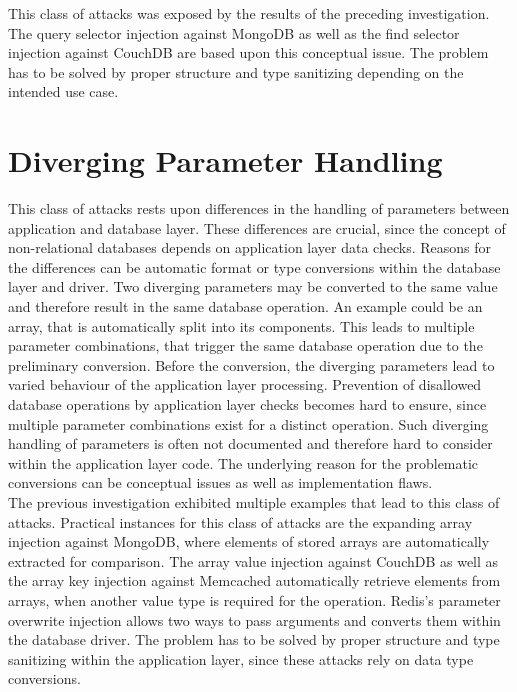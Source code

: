 This class of attacks was exposed by the results of the preceding investigation. The query selector injection against MongoDB as well as the find selector injection against CouchDB are based upon this conceptual issue. The problem has to be solved by proper structure and type sanitizing depending on the intended use case.

\section{Diverging Parameter Handling}
This class of attacks rests upon differences in the handling of parameters between application and database layer. These differences are crucial, since the concept of non-relational databases depends on application layer data checks. Reasons for the differences can be automatic format or type conversions within the database layer and driver. Two diverging parameters may be converted to the same value and therefore result in the same database operation. An example could be an array, that is automatically split into its components. This leads to multiple parameter combinations, that trigger the same database operation due to the preliminary conversion. Before the conversion, the diverging parameters lead to varied behaviour of the application layer processing. Prevention of disallowed database operations by application layer checks becomes hard to ensure, since multiple parameter combinations exist for a distinct operation. Such diverging handling of parameters is often not documented and therefore hard to consider within the application layer code. The underlying reason for the problematic conversions can be conceptual issues as well as implementation flaws.\\

The previous investigation exhibited multiple examples that lead to this class of attacks. Practical instances for this class of attacks are the expanding array injection against MongoDB, where elements of stored arrays are automatically extracted for comparison. The array value injection against CouchDB as well as the array key injection against Memcached automatically retrieve elements from arrays, when another value type is required for the operation. Redis's parameter overwrite injection allows two ways to pass arguments and converts them within the database driver. The problem has to be solved by proper structure and type sanitizing within the application layer, since these attacks rely on data type conversions.

